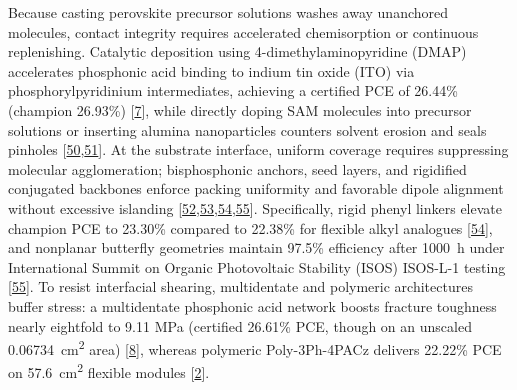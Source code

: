 \documentclass[
  11pt,
]{article}
\begin{document}
Because casting perovskite precursor solutions washes away unanchored
molecules, contact integrity requires accelerated chemisorption or
continuous replenishing. Catalytic deposition using
4-dimethylaminopyridine (DMAP) accelerates phosphonic acid binding to
indium tin oxide (ITO) via phosphorylpyridinium intermediates, achieving
a certified PCE of 26.44\% (champion 26.93\%)
{[}\href{https://doi.org/10.1021/acsenergylett.6c01257}{7}{]}, while
directly doping SAM molecules into precursor solutions or inserting
alumina nanoparticles counters solvent erosion and seals pinholes
{[}\href{https://doi.org/10.1021/acsami.6c02373}{50},\href{https://doi.org/10.1002/smll.74200}{51}{]}.
At the substrate interface, uniform coverage requires suppressing
molecular agglomeration; bisphosphonic anchors, seed layers, and
rigidified conjugated backbones enforce packing uniformity and favorable
dipole alignment without excessive islanding
{[}\href{https://doi.org/10.1002/adfm.76418}{52},\href{https://doi.org/10.1002/adma.73567}{53},\href{https://doi.org/10.1002/adfm.76243}{54},\href{https://doi.org/10.1002/smll.74278}{55}{]}.
Specifically, rigid phenyl linkers elevate champion PCE to 23.30\%
compared to 22.38\% for flexible alkyl analogues
{[}\href{https://doi.org/10.1002/adfm.76243}{54}{]}, and nonplanar
butterfly geometries maintain 97.5\% efficiency after \qty{1000}{\hour}
under International Summit on Organic Photovoltaic Stability (ISOS)
ISOS-L-1 testing {[}\href{https://doi.org/10.1002/smll.74278}{55}{]}. To
resist interfacial shearing, multidentate and polymeric architectures
buffer stress: a multidentate phosphonic acid network boosts fracture
toughness nearly eightfold to 9.11 MPa (certified 26.61\% PCE, though on
an unscaled \qty{0.06734}{\centi\meter\squared} area)
{[}\href{https://doi.org/10.1002/aenm.71159}{8}{]}, whereas polymeric
Poly-3Ph-4PACz delivers 22.22\% PCE on \qty{57.6}{\centi\meter\squared}
flexible modules
{[}\href{https://doi.org/10.1038/s41467-026-73276-w}{2}{]}.
\end{document}
